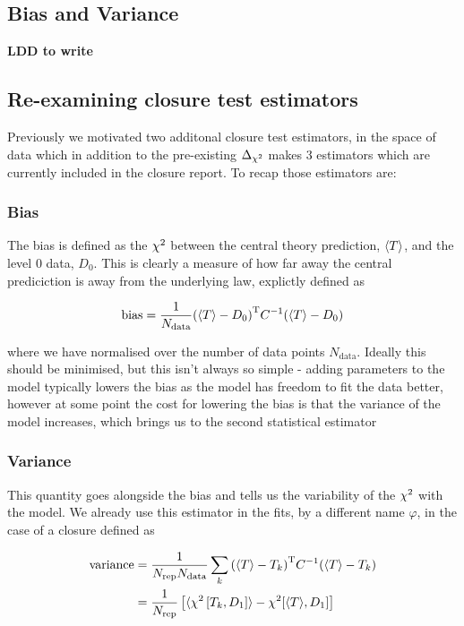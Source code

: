 \subsection{Bias and Variance}
\label{sec:BandV}

{\bf LDD to write}

\subsection{Re-examining closure test estimators}

Previously we motivated two additonal closure test estimators, in the space of data
which in addition to the pre-existing $\Delta_{\chi^{2}}$ makes 3 estimators which are currently
included in the \vphys closure report. To recap those estimators are:

\subsubsection*{Bias}

The bias is defined as the $\chi^{2}$ between the central theory prediction, $\langle T \rangle$,
and the level 0 data, $D_{0}$. This is clearly a measure of how far away the
central prediciction is away from the underlying law, explictly defined as

\begin{equation}
    \mathrm{bias} = \frac{1}{N_{\mathrm{data}}} {(\langle T \rangle - D_{0})}^{\mathrm{T}} C^{-1} (\langle T \rangle - D_{0})
\end{equation}

where we have normalised over the number of data points $N_{\mathrm{data}}$. Ideally this should
be minimised, but this isn't always so simple - adding parameters to the model
typically lowers the bias as the model has freedom to fit the data better, however at some point the
cost for lowering the bias is that the variance of the model increases, which brings us to the second
statistical estimator

\subsubsection*{Variance}

This quantity goes alongside the bias and tells us the variability of the $\chi^{2}$ with the model. We
already use this estimator in the fits, by a different name $\varphi$, in the case of a closure
defined as

\begin{equation}
    \begin{split}
        \mathrm{variance} &= \frac{1}{N_{\mathrm{rep}} N_{\mathrm{data}}} \sum_{k} {(\langle T \rangle - T_{k})}^{\mathrm{T}} C^{-1} (\langle T \rangle - T_{k}) \\
        &= \frac{1}{N_{\mathrm{rep}}} \left[ \langle \chi^{2} \left[ T_{k}, D_{1} \right] \rangle - \chi^{2}[\langle T \rangle, D_{1}] \right]
    \end{split}
\end{equation}

